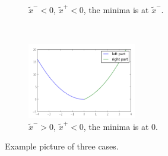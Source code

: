 \documentclass{article}
\newenvironment{qparts}{\begin{enumerate}[1.]}{\end{enumerate}}
\begin{document}
\begin{qparts}
\begin{figure}[!htb]
\begin{subfigure}[t]{0.31\textwidth}
        \caption{$\tilde{x}^-<0$, $\tilde{x}^+<0$, the minima is at $\tilde{x}^-$.}
    \end{subfigure}
    ~
    \begin{subfigure}[t]{0.31\textwidth}
        \centering
        \includegraphics[height=1.3in]{fig/fig-han-3.PNG}
        \caption{$\tilde{x}^->0$, $\tilde{x}^+<0$, the minima is at 0.}
    \end{subfigure}
    \caption{Example picture of three cases.}
    \label{fig:hl1} 
\end{figure}
\end{qparts}


\newpage
\end{document}
